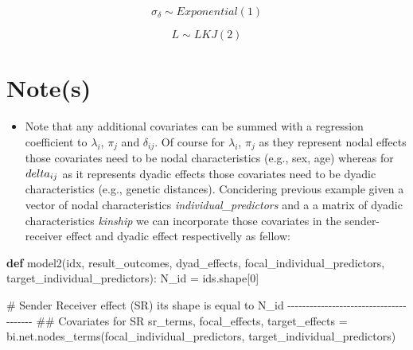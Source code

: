 \documentclass[
  letterpaper,
  DIV=11,
  numbers=noendperiod]{scrreprt}
\newenvironment{Shaded}{\begin{snugshade}}{\end{snugshade}}
\newcommand{\CommentTok}[1]{\textcolor[rgb]{0.37,0.37,0.37}{#1}}
\newcommand{\DecValTok}[1]{\textcolor[rgb]{0.68,0.00,0.00}{#1}}
\newcommand{\KeywordTok}[1]{\textcolor[rgb]{0.00,0.23,0.31}{\textbf{#1}}}
\newcommand{\NormalTok}[1]{\textcolor[rgb]{0.00,0.23,0.31}{#1}}
\newcommand{\OperatorTok}[1]{\textcolor[rgb]{0.37,0.37,0.37}{#1}}
\providecommand{\tightlist}{%
  \setlength{\itemsep}{0pt}\setlength{\parskip}{0pt}}\usepackage{longtable,booktabs,array}
\begin{document}
\[
\sigma_\delta \sim Exponential(1)
\]

\[
L \sim LKJ(2)
\]

\section{Note(s)}\label{notes-9}

\begin{tcolorbox}[enhanced jigsaw, toptitle=1mm, opacityback=0, titlerule=0mm, breakable, bottomrule=.15mm, colframe=quarto-callout-note-color-frame, arc=.35mm, coltitle=black, left=2mm, opacitybacktitle=0.6, leftrule=.75mm, toprule=.15mm, rightrule=.15mm, bottomtitle=1mm, colbacktitle=quarto-callout-note-color!10!white, title=\textcolor{quarto-callout-note-color}{\faInfo}\hspace{0.5em}{Note}, colback=white]

\begin{itemize}
\tightlist
\item
  Note that any additional covariates can be summed with a regression
  coefficient to \(\lambda_i\), \(\pi_j\) and \(\delta_{ij}\). Of course
  for \(\lambda_i\), \(\pi_j\) as they represent nodal effects those
  covariates need to be nodal characteristics (e.g., sex, age) whereas
  for \(\\delta_{ij}\) as it represents dyadic effects those covariates
  need to be dyadic characteristics (e.g., genetic distances).
  Concidering previous example given a vector of nodal characteristics
  \emph{individual\_predictors} and a a matrix of dyadic characteristics
  \emph{kinship} we can incorporate those covariates in the
  sender-receiver effect and dyadic effect respectivelly as fellow:
\end{itemize}

\begin{Shaded}
\begin{Highlighting}[]
\KeywordTok{def}\NormalTok{ model2(idx, result\_outcomes, dyad\_effects, focal\_individual\_predictors, target\_individual\_predictors):}
\NormalTok{    N\_id }\OperatorTok{=}\NormalTok{ ids.shape[}\DecValTok{0}\NormalTok{]}

    \CommentTok{\# Sender Receiver effect (SR) its shape is equal to N\_id {-}{-}{-}{-}{-}{-}{-}{-}{-}{-}{-}{-}{-}{-}{-}{-}{-}{-}{-}{-}{-}{-}{-}{-}{-}{-}{-}{-}{-}{-}{-}{-}{-}{-}{-}{-}{-}{-}{-}}
    \CommentTok{\#\# Covariates for SR}
\NormalTok{    sr\_terms, focal\_effects, target\_effects }\OperatorTok{=}\NormalTok{ bi.net.nodes\_terms(focal\_individual\_predictors, target\_individual\_predictors) }


\end{Highlighting}
\end{Shaded}
\end{tcolorbox}
\end{document}
